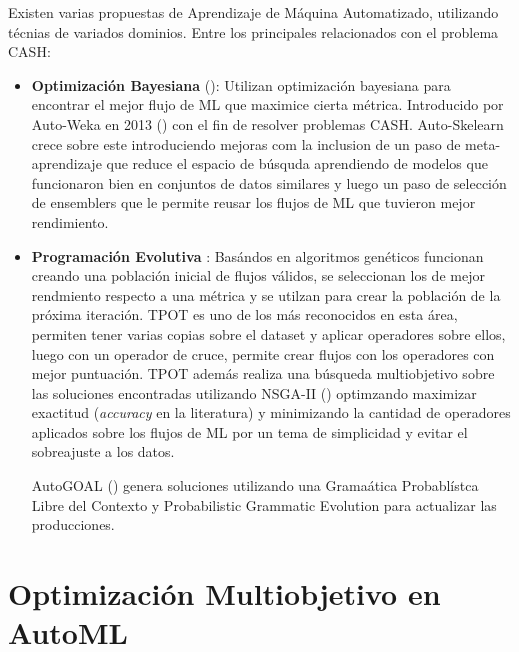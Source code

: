 
Existen varias propuestas de Aprendizaje de M\'aquina Automatizado, utilizando t\'ecnias de variados dominios. Entre los principales relacionados con el problema CASH:
\begin{itemize}
    \item \textbf{Optimizaci\'on Bayesiana} (\cite{hutter2019automated}): Utilizan optimizaci\'on bayesiana para encontrar el mejor flujo de ML que maximice cierta m\'etrica. Introducido por Auto-Weka en 2013 (\cite{thornton2013auto}) con el fin de resolver problemas CASH. Auto-Skelearn \cite{feurer2015efficient} crece sobre este introduciendo mejoras com la inclusion de un paso de meta-aprendizaje que reduce el espacio de b\'usquda aprendiendo de modelos que funcionaron bien en conjuntos de datos similares y luego un paso de selecci\'on de ensemblers que le permite reusar los flujos de ML que tuvieron mejor rendimiento.
    
    \item \textbf{Programaci\'on Evolutiva} \cite{chen2018autostacker}: Bas\'andos en algoritmos gen\'eticos funcionan creando una poblaci\'on inicial de flujos v\'alidos, se seleccionan los de mejor rendmiento respecto a una m\'etrica y se utilzan para crear la poblaci\'on de la pr\'oxima iteraci\'on. TPOT es uno de los m\'as reconocidos en esta \'area, permiten tener varias copias sobre el dataset y aplicar operadores sobre ellos, luego con un operador de cruce, permite crear flujos con los operadores con mejor puntuaci\'on. TPOT adem\'as realiza una b\'usqueda multiobjetivo sobre las soluciones encontradas utilizando NSGA-II (\cite{deb2002fast}) optimzando maximizar exactitud (\textit{accuracy} en la literatura) y minimizando la cantidad de operadores aplicados sobre los flujos de ML por un tema de simplicidad y evitar el sobreajuste a los datos.

        AutoGOAL (\cite{estevez2020solving}) genera soluciones utilizando una Grama\'atica Probabl\'istca Libre del Contexto y Probabilistic Grammatic Evolution para actualizar las producciones.
    
\end{itemize}



\section{Optimizaci\'on Multiobjetivo en AutoML}

